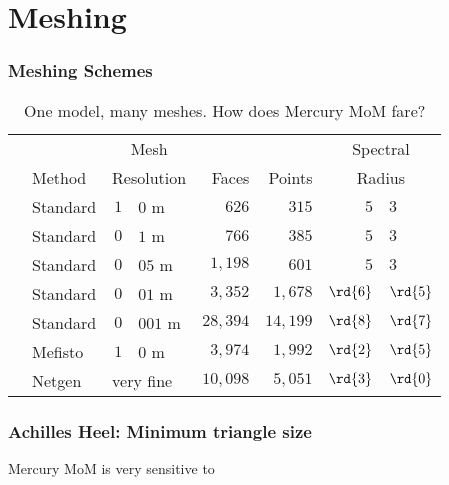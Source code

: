 % 

\section{Meshing}

\begin{frame}
	\frametitle{Meshing Schemes}
	\begin{table}[htp]
		\begin{center}
			\begin{tabular}{clr@{.}lrrr@{.}l}
					&&\multicolumn{2}{c}{Mesh}&&&  \multicolumn{2}{c}{Spectral} \\
				&Method &  \multicolumn{2}{l}{Resolution} & Faces & Points & \multicolumn{2}{c}{Radius} \\\hline
				\cmark & Standard & $1$ & $0$ m 		& $626$  		& $315$  & $5$ & $3$\\
				\cmark & Standard & $0$ & $1$ m 		& $766$ 		& $385$ & $5$ & $3$ \\
				\cmark & Standard & $0$ & $05$ m 	& $1,198$ 	& $601$ & $5$ & $3$\\\arrayrulecolor{medgray}\hline
				\xmark & Standard & $0$ & $01$ m 	& $3,352$	& 	$1,678$ & $\rd{6}$ & $\rd{5}$\\
				\xmark & Standard & $0$ & $001$ m 	& $28,394$ 	& $14,199$ & $\rd{8}$ & $\rd{7}$ \\
				\xmark & Mefisto & $1$ & $0$ m 		& $3,974$ 	& $1,992$ & $\rd{2}$ & $\rd{5}$ \\
				\xmark & Netgen &  \multicolumn{2}{l}{very fine}& $10,098$	& $5,051$  & $\rd{3}$ & $\rd{0}$\\
			\end{tabular}
		\end{center}
	\caption{One model, many meshes. How does Mercury MoM fare? }
	\label{tab:features}
	\end{table}%
\end{frame}

\begin{frame}
	\frametitle{Achilles Heel: Minimum triangle size}
	Mercury MoM is very sensitive to \color{red}{Spectral radius}
\end{frame}


